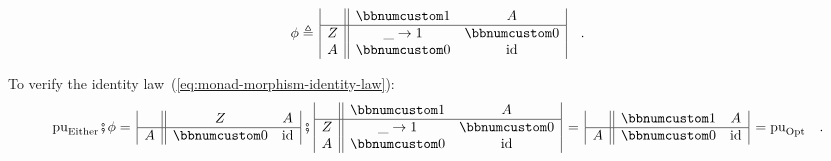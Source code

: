 ~\vspace{-0.7\baselineskip}
\[
\phi\triangleq\,\begin{array}{|c||cc|}
 & \bbnum 1 & A\\
\hline Z & \_\rightarrow1 & \bbnum 0\\
A & \bbnum 0 & \text{id}
\end{array}\quad.
\]

To verify the identity law~(\ref{eq:monad-morphism-identity-law}):
\[
\text{pu}_{\text{Either}}\bef\phi=\,\begin{array}{|c||cc|}
 & Z & A\\
\hline A & \bbnum 0 & \text{id}
\end{array}\,\bef\,\begin{array}{|c||cc|}
 & \bbnum 1 & A\\
\hline Z & \_\rightarrow1 & \bbnum 0\\
A & \bbnum 0 & \text{id}
\end{array}\,=\,\begin{array}{|c||cc|}
 & \bbnum 1 & A\\
\hline A & \bbnum 0 & \text{id}
\end{array}\,=\text{pu}_{\text{Opt}}\quad.
\]

